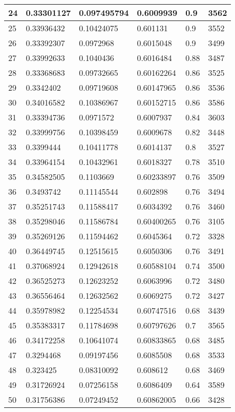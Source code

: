 \begin{longtable}{|l|l|l|l|l|l|}
24 & 0.33301127 & 0.097495794 & 0.6009939 & 0.9 & 3562 \\ \hline 
25 & 0.33936432 & 0.10424075 & 0.601131 & 0.9 & 3552 \\ \hline 
26 & 0.33392307 & 0.0972968 & 0.6015048 & 0.9 & 3499 \\ \hline 
27 & 0.33992633 & 0.1040436 & 0.6016484 & 0.88 & 3487 \\ \hline 
28 & 0.33368683 & 0.09732665 & 0.60162264 & 0.86 & 3525 \\ \hline 
29 & 0.3342402 & 0.09719608 & 0.60147965 & 0.86 & 3536 \\ \hline 
30 & 0.34016582 & 0.10386967 & 0.60152715 & 0.86 & 3586 \\ \hline 
31 & 0.33394736 & 0.0971572 & 0.6007937 & 0.84 & 3603 \\ \hline 
32 & 0.33999756 & 0.10398459 & 0.6009678 & 0.82 & 3448 \\ \hline 
33 & 0.3399444 & 0.10411778 & 0.6014137 & 0.8 & 3527 \\ \hline 
34 & 0.33964154 & 0.10432961 & 0.6018327 & 0.78 & 3510 \\ \hline 
35 & 0.34582505 & 0.1103669 & 0.60233897 & 0.76 & 3509 \\ \hline 
36 & 0.3493742 & 0.11145544 & 0.602898 & 0.76 & 3494 \\ \hline 
37 & 0.35251743 & 0.11588417 & 0.6034392 & 0.76 & 3460 \\ \hline 
38 & 0.35298046 & 0.11586784 & 0.60400265 & 0.76 & 3105 \\ \hline 
39 & 0.35269126 & 0.11594462 & 0.6045364 & 0.72 & 3328 \\ \hline 
40 & 0.36449745 & 0.12515615 & 0.6050306 & 0.76 & 3491 \\ \hline 
41 & 0.37068924 & 0.12942618 & 0.60588104 & 0.74 & 3500 \\ \hline 
42 & 0.36525273 & 0.12623252 & 0.6063996 & 0.72 & 3480 \\ \hline 
43 & 0.36556464 & 0.12632562 & 0.6069275 & 0.72 & 3427 \\ \hline 
44 & 0.35978982 & 0.12254534 & 0.60747516 & 0.68 & 3439 \\ \hline 
45 & 0.35383317 & 0.11784698 & 0.60797626 & 0.7 & 3565 \\ \hline 
46 & 0.34172258 & 0.10641074 & 0.60833865 & 0.68 & 3485 \\ \hline 
47 & 0.3294468 & 0.09197456 & 0.6085508 & 0.68 & 3533 \\ \hline 
48 & 0.323425 & 0.08310092 & 0.608612 & 0.68 & 3469 \\ \hline 
49 & 0.31726924 & 0.07256158 & 0.6086409 & 0.64 & 3589 \\ \hline 
50 & 0.31756386 & 0.07249452 & 0.60862005 & 0.66 & 3428 \\ \hline 
\end{longtable}
